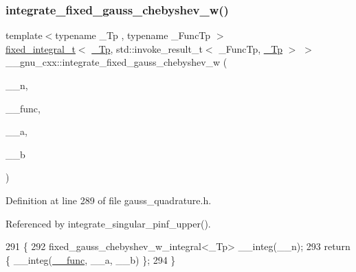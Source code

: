 \subsubsection{\texorpdfstring{integrate\+\_\+fixed\+\_\+gauss\+\_\+chebyshev\+\_\+w()}{integrate\_fixed\_gauss\_chebyshev\_w()}}
{\footnotesize\ttfamily template$<$typename \+\_\+\+Tp , typename \+\_\+\+Func\+Tp $>$ \\
\hyperlink{struct____gnu__cxx_1_1fixed__integral__t}{fixed\+\_\+integral\+\_\+t}$<$ \hyperlink{namespace____gnu__cxx_a3b19a9c800ca194374ef9172290f7d79}{\+\_\+\+Tp}, std\+::invoke\+\_\+result\+\_\+t$<$ \+\_\+\+Func\+Tp, \hyperlink{namespace____gnu__cxx_a3b19a9c800ca194374ef9172290f7d79}{\+\_\+\+Tp} $>$ $>$ \+\_\+\+\_\+gnu\+\_\+cxx\+::integrate\+\_\+fixed\+\_\+gauss\+\_\+chebyshev\+\_\+w (\begin{DoxyParamCaption}\item[{int}]{\+\_\+\+\_\+n,  }\item[{\+\_\+\+Func\+Tp}]{\+\_\+\+\_\+func,  }\item[{\hyperlink{namespace____gnu__cxx_a3b19a9c800ca194374ef9172290f7d79}{\+\_\+\+Tp}}]{\+\_\+\+\_\+a,  }\item[{\hyperlink{namespace____gnu__cxx_a3b19a9c800ca194374ef9172290f7d79}{\+\_\+\+Tp}}]{\+\_\+\+\_\+b }\end{DoxyParamCaption})}



Definition at line 289 of file gauss\+\_\+quadrature.\+h.



Referenced by integrate\+\_\+singular\+\_\+pinf\+\_\+upper().


\begin{DoxyCode}
291     \{
292       fixed\_gauss\_chebyshev\_w\_integral<\_Tp> \_\_integ(\_\_n);
293       \textcolor{keywordflow}{return} \{ \_\_integ(\hyperlink{namespace____gnu__cxx_af2b2f0c7a2ae72b922b1afefae5a65b2}{\_\_func}, \_\_a, \_\_b) \};
294     \}
\end{DoxyCode}
\mbox{\label{namespace____gnu__cxx_ac7e616f825ae281bc831d8743bb7b501}} 
